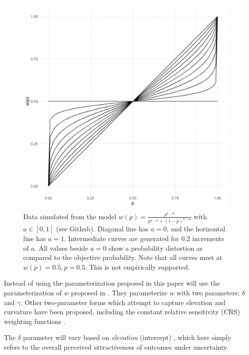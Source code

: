 \documentclass[12pt]{article}
\begin{document}
\begin{figure}[H]
	\includegraphics[width = \linewidth]{../Figures/oneParam.png}
	\caption{Data simulated from the model
		$w(p) = \frac{p^{1-a}}
		{p^{1-a}+(1-p)^{1-a}}$ with
		$a \in [0, 1]$ (see Github).
		Diagonal line has
		$a = 0$, and the horizontal line
		has $a = 1$. Intermediate curves
		are generated for $0.2$ increments
		of $a$. All values beside
		$a = 0$ show a probability distortion
		as compared to the objective probability.
		Note that all curves meet at
		$w(p) = 0.5, p = 0.5$. This is
	not empirically supported.}
\end{figure}

Instead of using the parameterization
proposed in \textcite{rottenstreich2001money}
this paper will use the parameterization
of $w$ proposed in \textcite{gonzalez1999shape}.
They parameterize $w$ with two parameters;
$\delta$ and $\gamma$. Other two-parameter
forms which attempt to capture elevation and
curvature have been proposed, including the
constant relative sensitivity (CRS) weighting
functions \autocite{abdellaoui2010separating}.

\vspace{3mm}

The $\delta$ parameter will vary based on
\emph{elevation} (intercept)
\autocite{gonzalez1999shape},
which here simply refers to the overall
perceived attractiveness of outcomes
under uncertainty.
\end{document}
